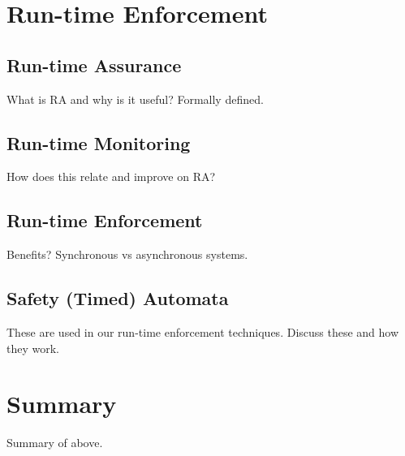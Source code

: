 \section{Run-time Enforcement}
\subsection{Run-time Assurance}
What is RA and why is it useful? Formally defined.

\subsection{Run-time Monitoring}
How does this relate and improve on RA?

\subsection{Run-time Enforcement}
Benefits? Synchronous vs asynchronous systems. 

\subsection{Safety (Timed) Automata}
These are used in our run-time enforcement techniques. Discuss these and how they work.

\section{Summary}
Summary of above.